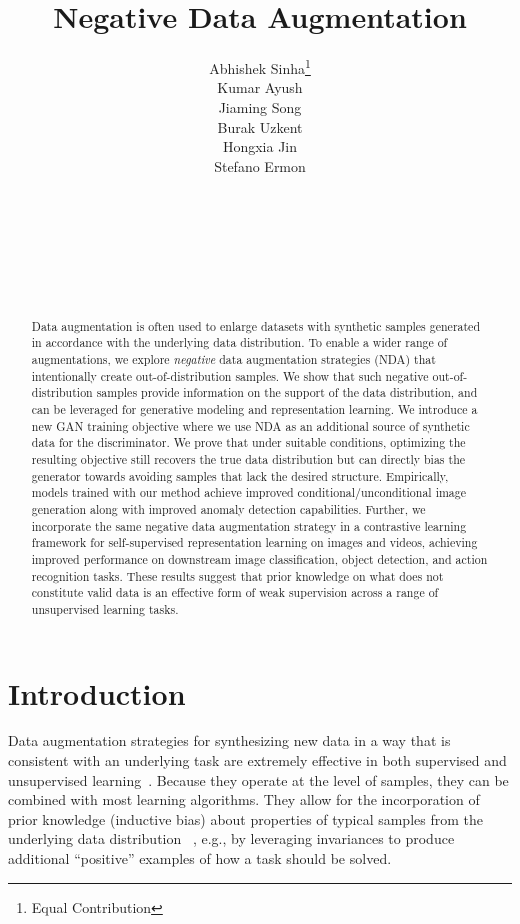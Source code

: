 \documentclass{article} \usepackage{iclr2021_conference,times}
\title{Negative Data Augmentation}
\author{Abhishek Sinha\thanks{Equal Contribution} \\
  \And 
  Kumar Ayush\footnotemark[1] \\
  \And
  Jiaming Song\footnotemark[1] \\
  \And
  Burak Uzkent \\
  \And
  Hongxia Jin \\
  \And
  \hspace{6cm} Stefano Ermon \\
  
  \\
  \normalfont {Department of Computer Science}\\
  \normalfont {Stanford University}\\
  \normalfont {\{a7b23, kayush, tsong, buzkent, ermon\}@stanford.edu}
  \\
  \\
  \normalfont {Samsung Research America}\\
  }
\begin{document}
\maketitle

\begin{abstract}






Data augmentation is often used to enlarge datasets with synthetic samples generated in accordance with the underlying data distribution. To enable a wider range of augmentations, we explore \emph{negative} data augmentation strategies (NDA) that intentionally create out-of-distribution samples. We show that such negative out-of-distribution samples provide information on the support of the data distribution,  and 
can be leveraged for generative modeling and representation learning. We introduce a new GAN training objective where we use NDA as an additional source of synthetic data for the discriminator. We prove that under suitable conditions, optimizing the resulting objective still recovers the true data distribution but can directly bias the generator towards avoiding samples that lack the desired structure. Empirically, models trained with our method achieve improved conditional/unconditional image generation along with improved anomaly detection capabilities. Further, we incorporate the same negative data augmentation strategy in a 
contrastive learning framework for self-supervised representation learning on images and videos, achieving improved performance on downstream image classification, object detection, and action recognition tasks. These results suggest that prior knowledge on what does not constitute valid data is an effective form of weak supervision across a range of unsupervised learning tasks. \end{abstract}

\section{Introduction}
Data augmentation strategies for synthesizing new data in a way that is consistent with an underlying task are extremely effective in both supervised and unsupervised learning~\citep{oord2018representation,zhang2016colorful,noroozi2016unsupervised,asano2019critical}. Because they operate at the level of samples, they can be combined with most learning algorithms.
They allow for the incorporation of prior knowledge (inductive bias) about properties of typical samples from the underlying data distribution ~\citep{jaiswal2018unsupervised,antoniou2017data}, 
e.g., by leveraging invariances to produce additional ``positive'' examples of how a task should be solved.
\end{document}
